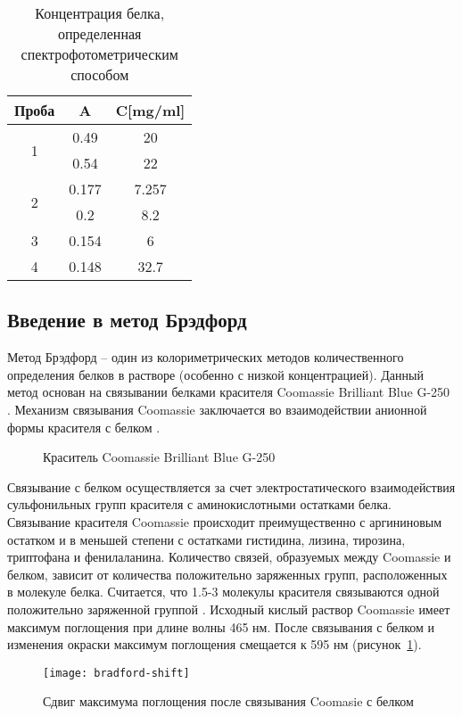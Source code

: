 \begin{table}[htbp]
\caption{Концентрация белка, определенная спектрофотометрическим способом}
\begin{tabular}{|c|c|c|}
\hline
Проба & A & C[mg/ml] \\
\hline
\multirow{2}{*}{1} & 0.49 & 20 \\
& 0.54 & 22 \\
\hline
\multirow{2}{*}{2} & 0.177 & 7.257 \\
& 0.2 & 8.2 \\
\hline
3 & 0.154 & 6 \\
\hline
4 & 0.148 & 32.7 \\
\hline
\end{tabular}
\label{table-spm}
\end{table}

\subsection{Введение в метод Брэдфорд}
Метод Брэдфорд -- один из колориметрических методов количественного определения белков в растворе
(особенно с низкой концентрацией).
Данный метод основан на связывании белками красителя Coomassie Brilliant Blue G-250 \cite{bradford-1}.
Механизм связывания Coomassie заключается во взаимодействии анионной формы красителя с белком \cite{bradford-2}.

\begin{figure}[htbp]
\def\svgwidth{0.7\linewidth}
\caption{Краситель Coomassie Brilliant Blue G-250}
\end{figure}

Связывание с белком осуществляется за счет электростатического взаимодействия сульфонильных групп
красителя с аминокислотными остатками белка.
Связывание красителя Coomassie происходит преимущественно с аргининовым остатком и в меньшей степени с
остатками гистидина, лизина, тирозина, триптофана и фенилаланина.
Количество связей, образуемых между Coomassie и белком, зависит от количества положительно заряженных групп,
расположенных в молекуле белка.
Считается, что 1.5-3 молекулы красителя связываются одной положительно заряженной группой \cite{bradford-3}.
Исходный кислый раствор Coomassie имеет максимум поглощения при длине волны 465 нм.
После связывания с белком и изменения окраски максимум поглощения смещается к 595 нм
(рисунок~\ref{fig-shift}).

\begin{figure}[htbp]
\texttt{[image: bradford-shift]}
\caption{Сдвиг максимума поглощения после связывания Coomasie с белком}
\label{fig-shift}
\end{figure}

